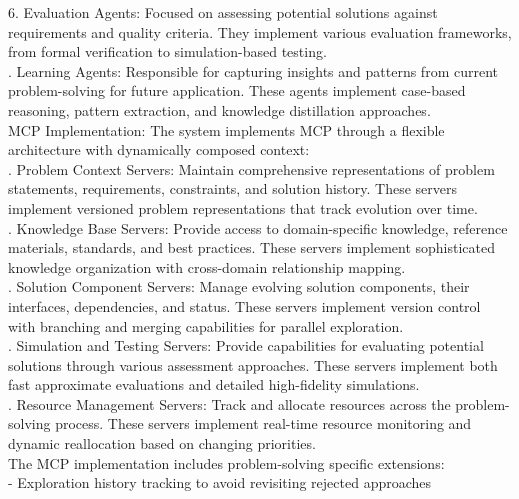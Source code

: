 6. Evaluation Agents: Focused on assessing potential solutions against requirements and quality criteria. They implement various evaluation frameworks, from formal verification to simulation-based testing.\\ . Learning Agents: Responsible for capturing insights and patterns from current problem-solving for future application. These agents implement case-based reasoning, pattern extraction, and knowledge distillation approaches.\\ \newline
MCP Implementation: The system implements MCP through a flexible architecture with dynamically composed context:\\ . Problem Context Servers: Maintain comprehensive representations of problem statements, requirements, constraints, and solution history. These servers implement versioned problem representations that track evolution over time.\\ . Knowledge Base Servers: Provide access to domain-specific knowledge, reference materials, standards, and best practices. These servers implement sophisticated knowledge organization with cross-domain relationship mapping.\\ . Solution Component Servers: Manage evolving solution components, their interfaces, dependencies, and status. These servers implement version control with branching and merging capabilities for parallel exploration.\\ . Simulation and Testing Servers: Provide capabilities for evaluating potential solutions through various assessment approaches. These servers implement both fast approximate evaluations and detailed high-fidelity simulations.\\ . Resource Management Servers: Track and allocate resources across the problem-solving process. These servers implement real-time resource monitoring and dynamic reallocation based on changing priorities.\\ \newline
The MCP implementation includes problem-solving specific extensions:\\ \newline
- Exploration history tracking to avoid revisiting rejected approaches\\ \newline
